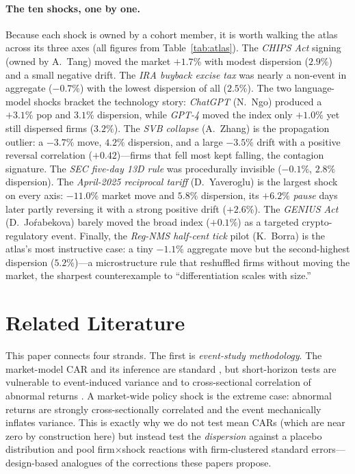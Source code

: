 \documentclass[12pt]{article}
\begin{document}
\paragraph{The ten shocks, one by one.} Because each shock is owned by a cohort member, it is worth
walking the atlas across its three axes (all figures from Table~\ref{tab:atlas}). The \emph{CHIPS Act}
signing (owned by A.\ Tang) moved the market $+1.7\%$ with modest dispersion ($2.9\%$) and a small
negative drift. The \emph{IRA buyback excise tax} was nearly a non-event in aggregate ($-0.7\%$) with
the lowest dispersion of all ($2.5\%$). The two language-model shocks bracket the technology story:
\emph{ChatGPT} (N.\ Ngo) produced a $+3.1\%$ pop and $3.1\%$ dispersion, while \emph{GPT-4} moved the
index only $+1.0\%$ yet still dispersed firms ($3.2\%$). The \emph{SVB collapse} (A.\ Zhang) is the
propagation outlier: a $-3.7\%$ move, $4.2\%$ dispersion, and a large $-3.5\%$ drift with a positive
reversal correlation ($+0.42$)---firms that fell most kept falling, the contagion signature. The
\emph{SEC five-day 13D rule} was procedurally invisible ($-0.1\%$, $2.8\%$ dispersion). The
\emph{April-2025 reciprocal tariff} (D.\ Yaveroglu) is the largest shock on every axis: $-11.0\%$
market move and $5.8\%$ dispersion, its $+6.2\%$ \emph{pause} days later partly reversing it with a
strong positive drift ($+2.6\%$). The \emph{GENIUS Act} (D.\ Jo\'rabekova) barely moved the broad
index ($+0.1\%$) as a targeted crypto-regulatory event. Finally, the \emph{Reg-NMS half-cent tick}
pilot (K.\ Borra) is the atlas's most instructive case: a tiny $-1.1\%$ aggregate move but the
second-highest dispersion ($5.2\%$)---a microstructure rule that reshuffled firms without moving the
market, the sharpest counterexample to ``differentiation scales with size.''

\section{Related Literature}\label{sec:lit}
This paper connects four strands. The first is \emph{event-study methodology}. The market-model
CAR and its inference are standard \citep{brown1985,mackinlay1997,campbell1997}, but short-horizon
tests are vulnerable to event-induced variance and to cross-sectional correlation of abnormal
returns \citep{boehmer1991,kolari2010}. A market-wide policy shock is the extreme case: abnormal
returns are strongly cross-sectionally correlated and the event mechanically inflates variance.
This is exactly why we do not test mean CARs (which are near zero by construction here) but instead
test the \emph{dispersion} against a placebo distribution and pool firm$\times$shock reactions with
firm-clustered standard errors---design-based analogues of the corrections these papers propose.
\end{document}
